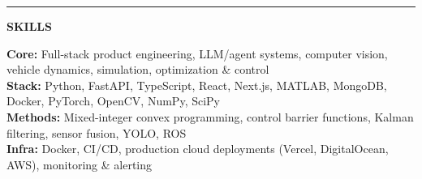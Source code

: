 \documentclass[10pt,letterpaper]{article}
\newlength{\sectionspaceabove}    \setlength{\sectionspaceabove}{8pt}   %
\newlength{\sectionlinetotitlegap}    \setlength{\sectionlinetotitlegap}{0pt}   %
\newlength{\sectiontitletocontentgap} \setlength{\sectiontitletocontentgap}{-8pt}  %
\newcommand{\sectionfontsize}{\fontsize{10pt}{10pt}\selectfont}
\newcommand{\ressection}[1]{%
  \vspace{\sectionspaceabove}%
  \hrule
  \vspace{\sectionlinetotitlegap}%
  \begin{center}{\sectionfontsize\textbf{#1}}\end{center}%
  \vspace{\sectiontitletocontentgap}%
}
\begin{document}
\ressection{SKILLS}

\noindent\textbf{Core:} Full-stack product engineering, LLM/agent systems, computer vision, vehicle dynamics, simulation, optimization \& control \\
\textbf{Stack:} Python, FastAPI, TypeScript, React, Next.js, MATLAB, MongoDB, Docker, PyTorch, OpenCV, NumPy, SciPy \\
\textbf{Methods:} Mixed-integer convex programming, control barrier functions, Kalman filtering, sensor fusion, YOLO, ROS \\
\textbf{Infra:} Docker, CI/CD, production cloud deployments (Vercel, DigitalOcean, AWS), monitoring \& alerting
\end{document}
